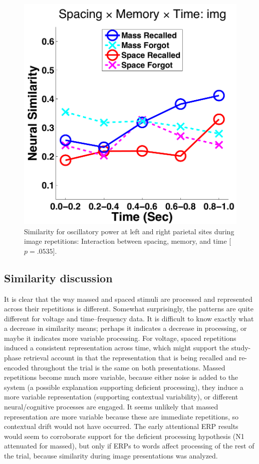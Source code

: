 \begin{figure}
  \centering
  \includegraphics[width=.40\textwidth]{./figs/exp1/similarity_spacXmemXtime_img_pow_LPSRPS_0to200_200to400_400to600_600to800_800to1000_kaiser_cosine}
  \caption{Similarity for oscillatory power at left and right parietal sites during image repetitions: Interaction between spacing, memory, and time [$p=.0535$].}
  \label{fig:sim_pow_spacXmemXtime}
\end{figure}

\subsection{Similarity discussion}

It is clear that the way massed and spaced stimuli are processed and represented across their repetitions is different.  Somewhat surprisingly, the patterns are quite different for voltage and time--frequency data.  It is difficult to know exactly what a decrease in similarity means; perhaps it indicates a decrease in processing, or maybe it indicates more variable processing.  For voltage, spaced repetitions induced a consistent representation across time, which might support the study-phase retrieval account in that the representation that is being recalled and re-encoded throughout the trial is the same on both presentations.  Massed repetitions become much more variable, because either noise is added to the system (a possible explanation supporting deficient processing), they induce a more variable representation (supporting contextual variability), or different neural/cognitive processes are engaged.  It seems unlikely that massed representation are more variable because these are immediate repetitions, so contextual drift would not have occurred.
The early attentional ERP results would seem to corroborate support for the deficient processing hypothesis (N1 attenuated for massed), but only if ERPs to words affect processing of the rest of the trial, because similarity during image presentations was analyzed.


